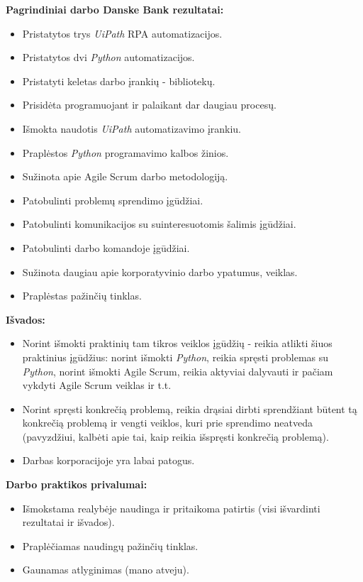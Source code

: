 \documentclass{VUMIFPSBakPrakAt}
\begin{document}
\textbf{Pagrindiniai darbo Danske Bank rezultatai:}
\vspace{10pt}
\begin{itemize}
    \item Pristatytos trys \textit{UiPath} RPA automatizacijos.
    \item Pristatytos dvi \textit{Python} automatizacijos.
    \item Pristatyti keletas darbo įrankių - bibliotekų. 
    \item Prisidėta programuojant ir palaikant dar daugiau procesų.
    \item Išmokta naudotis \textit{UiPath} automatizavimo įrankiu.
    \item Praplėstos \textit{Python} programavimo kalbos žinios.
    \item Sužinota apie Agile Scrum darbo metodologiją.
    \item Patobulinti problemų sprendimo įgūdžiai.
    \item Patobulinti komunikacijos su suinteresuotomis šalimis įgūdžiai.
    \item Patobulinti darbo komandoje įgūdžiai.
    \item Sužinota daugiau apie korporatyvinio darbo ypatumus, veiklas.
    \item Praplėstas pažinčių tinklas.
\end{itemize}
\vspace{10pt}
\par
\textbf{Išvados:}
\vspace{10pt}
\begin{itemize}
    \item Norint išmokti praktinių tam tikros veiklos įgūdžių - reikia atlikti šiuos praktinius įgūdžius: norint išmokti \textit{Python}, reikia spręsti problemas su \textit{Python}, norint išmokti Agile Scrum, reikia aktyviai dalyvauti ir pačiam vykdyti Agile Scrum veiklas ir t.t.
    \item Norint spręsti konkrečią problemą, reikia drąsiai dirbti sprendžiant būtent tą konkrečią problemą ir vengti veiklos, kuri prie sprendimo neatveda (pavyzdžiui, kalbėti apie tai, kaip reikia išspręsti konkrečią problemą).
    \item Darbas korporacijoje yra labai patogus.
\end{itemize}
\vspace{10pt}
\par
\textbf{Darbo praktikos privalumai:}
\vspace{10pt}
\begin{itemize}
    \item Išmokstama realybėje naudinga ir pritaikoma patirtis (visi išvardinti rezultatai ir išvados).
    \item Praplėčiamas naudingų pažinčių tinklas.
    \item Gaunamas atlyginimas (mano atveju).
\end{itemize}
\end{document}
